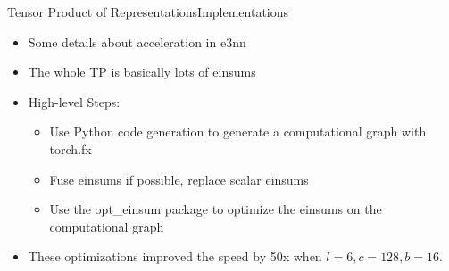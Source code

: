 \documentclass[pdf,serif]{beamer}
\begin{document}
\begin{frame}{Tensor Product of Representations}{Implementations}
    \begin{itemize}
        \item Some details about acceleration in e3nn
        \item The whole TP is basically lots of einsums
        \item High-level Steps:
        \begin{itemize}
            \item Use Python code generation to generate a computational graph with torch.fx
            \item Fuse einsums if possible, replace scalar einsums
            \item Use the opt\_einsum package to optimize the einsums on the computational graph
        \end{itemize}
        \item These optimizations improved the speed by 50x when $l=6, c=128, b=16$.
    \end{itemize}
\end{frame}
\end{document}
